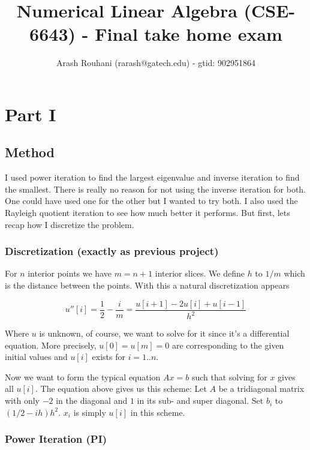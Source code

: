 \documentclass[a4paper,11pt]{article}
\title{Numerical Linear Algebra (CSE-6643) - Final take home exam}
\author{Arash Rouhani (rarash@gatech.edu) - gtid: 902951864}
\begin{document}
\maketitle

\section{Part I}


\subsection{Method}

I used power iteration to find the largest eigenvalue and inverse iteration to
find the smallest. There is really no reason for not using the inverse
iteration for both. One could have used one for the other but I wanted to try
both.  I also used the Rayleigh quotient iteration to see how much better it
performs. But first, lets recap how I discretize the problem.

\subsubsection{Discretization (exactly as previous project)}

For $n$ interior points we have $m=n+1$ interior slices. We define $h$
to $1/m$ which is the distance between the points. With this a natural
discretization appears

\[
  u''[i] = \frac{1}{2} - \frac{i}{m} = \frac{u[i+1]-2u[i]+u[i-1]}{h^2}
\]

Where $u$ is unknown, of course, we want to solve for it since it's a
differential equation. More precisely, $u[0]=u[m]=0$ are corresponding
to the given initial values and $u[i]$ exists for $i = 1..n$.

Now we want to form the typical equation $Ax=b$ such that solving for
$x$ gives all $u[i]$. The equation above gives us this scheme: Let $A$
be a tridiagonal matrix with only $-2$ in the diagonal and $1$ in its
sub- and super diagonal. Set $b_i$ to $(1/2-ih)h^2$. $x_i$ is simply
$u[i]$ in this scheme.


\subsubsection{Power Iteration (PI)}
\end{document}
